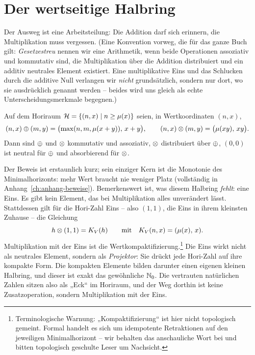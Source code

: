 \section{Der wertseitige Halbring}

Der Ausweg ist eine Arbeitsteilung: Die Addition darf sich erinnern,
die Multiplikation muss vergessen. (Eine Konvention vorweg, die für
das ganze Buch gilt: \emph{Gesetzestreu} nennen wir eine Arithmetik,
wenn beide Operationen assoziativ und kommutativ sind, die
Multiplikation über die Addition distribuiert und ein additiv
neutrales Element existiert. Eine multiplikative Eins und das
Schlucken durch die additive Null verlangen wir \emph{nicht}
grundsätzlich, sondern nur dort, wo sie ausdrücklich genannt
werden -- beides wird uns gleich als echte Unterscheidungsmerkmale
begegnen.)

\begin{satz}\label{satz:a3}
Auf dem Horiraum $\mathcal H=\{(n,x)\mid n\ge\mu(x)\}$ seien, in
Wertkoordinaten $(n,x)$,
\[
(n,x)\oplus(m,y)=\bigl(\max(n,m,\mu(x+y)),\,x+y\bigr),
\qquad
(n,x)\otimes(m,y)=\bigl(\mu(xy),\,xy\bigr).
\]
Dann sind $\oplus$ und $\otimes$ kommutativ und assoziativ,
$\otimes$ distribuiert über $\oplus$, $(0,0)$ ist neutral für
$\oplus$ und absorbierend für $\otimes$.
\end{satz}

Der Beweis ist erstaunlich kurz; sein einziger Kern ist die
Monotonie des Minimalhorizonts: mehr Wert braucht nie weniger Platz
(vollständig in Anhang~\ref{ch:anhang-beweise}).
Bemerkenswert ist, was diesem Halbring \emph{fehlt}: eine Eins. Es
gibt kein Element, das bei Multiplikation alles unverändert lässt.
Stattdessen gilt für die Hori-Zahl Eins -- also $(1,1)$, die Eins in
ihrem kleinsten Zuhause -- die Gleichung
\[
h\otimes(1,1)=K_V(h)
\qquad\text{mit}\quad
K_V(n,x)=(\mu(x),\,x).
\]
Multiplikation mit der Eins ist die
Wertkompaktifizierung.\footnote{Terminologische Warnung:
„Kompaktifizierung“ ist hier nicht topologisch gemeint. Formal
handelt es sich um idempotente Retraktionen auf den jeweiligen
Minimalhorizont -- wir behalten das anschauliche Wort bei und bitten
topologisch geschulte Leser um Nachsicht.} Die Eins
wirkt nicht als neutrales Element, sondern als \emph{Projektor}: Sie
drückt jede Hori-Zahl auf ihre kompakte Form. Die kompakten Elemente
bilden darunter einen eigenen kleinen Halbring, und dieser ist exakt
das gewöhnliche $\mathbb N_0$. Die vertrauten natürlichen Zahlen sitzen also
als „Eck“ im Horiraum, und der Weg dorthin ist keine Zusatzoperation,
sondern Multiplikation mit der Eins.

